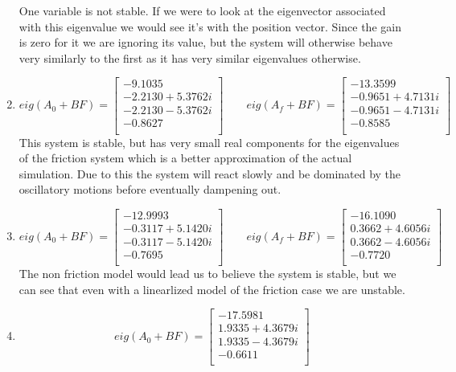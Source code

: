 \documentclass{article}
\begin{document}
\begin{enumerate}[1)]
$$$$
One variable is not stable. If we were to look at the eigenvector associated with this eigenvalue we would see it's with the position vector.
Since the gain is zero for it we are ignoring its value, but the system will otherwise behave very similarly to the first as it has very similar eigenvalues otherwise.
\item
$$ eig(A_0 + BF) =
\begin{bmatrix}
-9.1035 \\
-2.2130 + 5.3762i \\
-2.2130 - 5.3762i \\
-0.8627 \\
\end{bmatrix}
\qquad
eig(A_f + BF) =
\begin{bmatrix}
-13.3599 \\
-0.9651 + 4.7131i \\
-0.9651 - 4.7131i \\
-0.8585 \\
\end{bmatrix}
$$
This system is stable, but has very small real components for the eigenvalues of the friction system which is a better approximation of the actual simulation.
Due to this the system will react slowly and be dominated by the oscillatory motions before eventually dampening out.
\item
$$ eig(A_0 + BF) =
\begin{bmatrix}
-12.9993 \\
-0.3117 + 5.1420i \\
-0.3117 - 5.1420i \\
-0.7695 \\
\end{bmatrix}
\qquad
eig(A_f + BF) =
\begin{bmatrix}
-16.1090 \\
0.3662 + 4.6056i \\
0.3662 - 4.6056i \\
-0.7720 \\
\end{bmatrix}
$$
The non friction model would lead us to believe the system is stable, but we can see that even with a linearlized model of the friction case we are unstable.
\item
$$ eig(A_0 + BF) =
\begin{bmatrix}
-17.5981 \\
1.9335 + 4.3679i \\
1.9335 - 4.3679i \\
-0.6611 \\

\end{bmatrix}$$
\end{enumerate}
\end{document}

